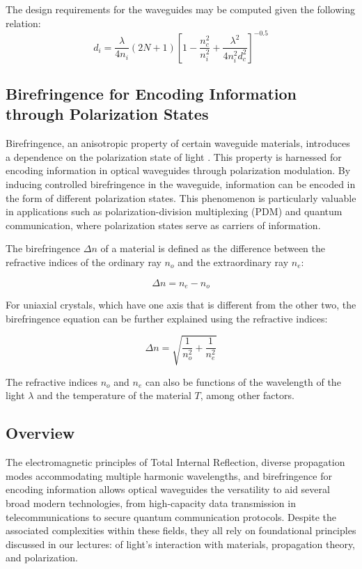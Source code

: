 \documentclass[10pt]{article}
\begin{document}
The design requirements for the waveguides may be computed given the following relation:
\begin{equation}
    d_i = \frac{\lambda}{4n_i}(2N + 1)\left[1 - \frac{n_c^2}{n_i^2} + \frac{\lambda^2}{4n_i^2d_c^2}\right]^{-0.5}
\end{equation}

\subsection{Birefringence for Encoding Information through Polarization States}

Birefringence, an anisotropic property of certain waveguide materials, introduces a dependence on the polarization state of light \cite{ref01}. This property is harnessed for encoding information in optical waveguides through polarization modulation.
By inducing controlled birefringence in the waveguide, information can be encoded in the form of different polarization states. This phenomenon is particularly valuable in applications such as polarization-division multiplexing (PDM) and quantum communication, where polarization states serve as carriers of information.

The birefringence \(\Delta n\) of a material is defined as the difference between the refractive indices of the ordinary ray \(n_o\) and the extraordinary ray \(n_e\):

\[
    \Delta n = n_e - n_o
    \]
    
    For uniaxial crystals, which have one axis that is different from the other two, the birefringence equation can be further explained using the refractive indices:
    
    \[
        \Delta n = \sqrt{\frac{1}{n_o^2} + \frac{1}{n_e^2}}
        \]
        
        The refractive indices \(n_o\) and \(n_e\) can also be functions of the wavelength of the light \(\lambda\) and the temperature of the material \(T\), among other factors.
        
        
        \subsection{Overview}
        The electromagnetic principles of Total Internal Reflection, diverse propagation modes accommodating multiple harmonic wavelengths, 
        and birefringence for encoding information allows optical waveguides the versatility to aid several broad modern technologies, 
        from high-capacity data transmission in telecommunications to secure quantum communication protocols. Despite the associated complexities within these fields, 
        they all rely on foundational principles discussed in our lectures: of light's interaction with materials, propagation theory, and polarization.
        
\end{document}
